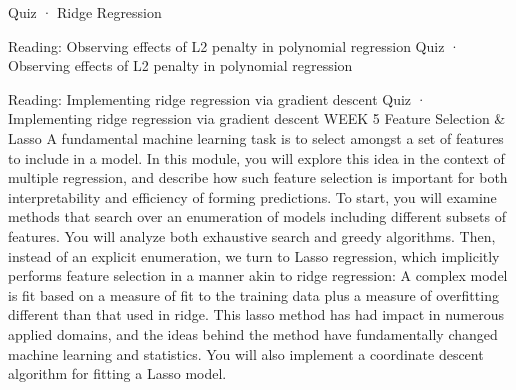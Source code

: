 Quiz · Ridge Regression
\item Reading: Observing effects of L2 penalty in polynomial regression
Quiz · Observing effects of L2 penalty in polynomial regression
\item Reading: Implementing ridge regression via gradient descent
Quiz · Implementing ridge regression via gradient descent
WEEK 5
Feature Selection & Lasso
A fundamental machine learning task is to select amongst a set of features to include in a model. In this module, you will explore this idea in the context of multiple regression, and describe how such feature selection is important for both interpretability and efficiency of forming predictions.
To start, you will examine methods that search over an enumeration of models including different subsets of features. You will analyze both exhaustive search and greedy algorithms. Then, instead of an explicit enumeration, we turn to Lasso regression, which implicitly performs feature selection in a manner akin to ridge regression: A complex model is fit based on a measure of fit to the training data plus a measure of overfitting different than that used in ridge. This lasso method has had impact in numerous applied domains, and the ideas behind the method have fundamentally changed machine learning and statistics. You will also implement a coordinate descent algorithm for fitting a Lasso model.

